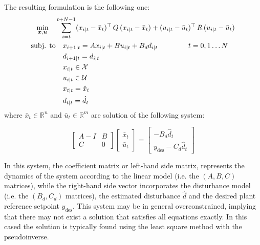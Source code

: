 \documentclass[a4paper,12pt,oneside]{book}
\begin{document}
The resulting formulation is the following one:
\begin{equation}
\begin{alignedat}{2}
	\min_{\substack{\boldsymbol{x}, \boldsymbol{u}}}\quad & \sum_{i=t}^{t+N-1} (x_{i|t} - \bar{x}_t) ^\top \, Q \, (x_{i|t} -  \bar{x}_t) +  (u_{i|t} - \bar{u}_t)^\top \, R \, (u_{i|t} - \bar{u}_t) &&  \\
	\text{subj. to} & \quad x_{i+1|t}  = A x_{i|t} + B u_{i|t} + B_d d_{i|t} \hspace{1.5cm} t = 0, 1 \ldots N &&  \\
    & \quad d_{i+1|t}  = d_{i|t} && \\
    &\quad x_{i|t} \in \mathcal{X} &&  \\
    &\quad u_{i|t} \in \mathcal{U} && \\
    &\quad x_{t|t} = \hat{x}_t && \\
    &\quad d_{t|t} = \hat{d}_t && 
\end{alignedat}
\label{MPC:offset-free}
\end{equation}
where $\bar{x}_t \in \mathbb{R}^n$ and $\bar{u}_t \in \mathbb{R}^m$ are solution of the following system:

\begin{equation}
    \begin{bmatrix}
    A-I & B \\
    C & 0
	\end{bmatrix}
 	\begin{bmatrix}
		\bar{x}_t \\
		\bar{u}_t
	\end{bmatrix}
    =
    \begin{bmatrix}
    -B_d \hat{d}_t\\
    y_{\text{des}} - C_d \hat{d}_t
	\end{bmatrix}
\end{equation}

In this system, the coefficient matrix or left-hand side matrix, represents the dynamics of the system according to the linear model (i.e. the $(A, B, C)$ matrices), while the right-hand side vector incorporates the disturbance model (i.e. the $(B_d, C_d)$ matrices), the estimated disturbance $\hat{d}$ and the desired plant reference setpoint $y_{\text{des}}$.
This system may be in general overconstrained, implying that there may not exist a solution that satisfies all equations exactly.
In this cased the solution is typically found using the least square method with the pseudoinverse.
\end{document}
